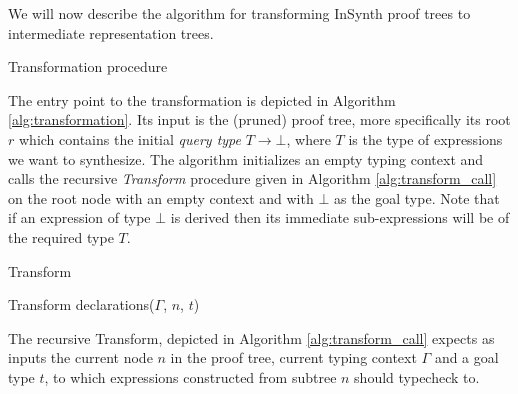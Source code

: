 We will now describe the algorithm for transforming InSynth proof trees to intermediate representation trees. 

\begin{algorithm}[ht]
\caption{Transformation procedure}
\label{alg:transformation}
\begin{algorithmic}[1]


\STATE {}


\end{algorithmic}
\end{algorithm}
The entry point to the transformation is depicted in Algorithm \ref{alg:transformation}.
Its input is the (pruned) proof tree, more specifically its root $r$ which contains the initial \textit{query type} $T \rightarrow \bot$, where $T$ is the type of expressions we want to synthesize.
The algorithm initializes an empty typing context and calls the recursive \textit{Transform} procedure given in Algorithm \ref{alg:transform_call} on the root node with an empty context and with $\bot$ as the goal type.
Note that if an expression of type $\bot$ is derived then its immediate sub-expressions will be of the required type $T$.



\begin{algorithm}[ht]
\caption{Transform}
\label{alg:transform_call}
\begin{algorithmic}[1]

\STATE{}

\ENDFOR
{}
\STATE{}
\ENDFOR
\ELSE
\RETURN Transform declarations($\Gamma$, $n$, $t$)
\ENDIF

\end{algorithmic}
\end{algorithm}
The recursive Transform, depicted in Algorithm \ref{alg:transform_call} expects as inputs the current node $n$ in the proof tree, current typing context $\Gamma$ and a goal type $t$, to which expressions constructed from subtree $n$ should typecheck to.

